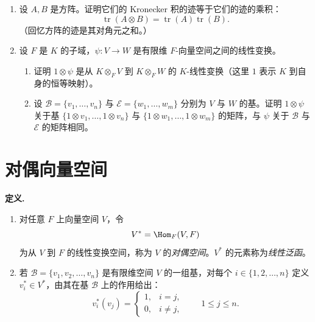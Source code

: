 \begin{enumerate}[label=\arabic*.,resume]
\begin{enumerate}[label=(\alph*)]
\item $F=\mathbb R$；
\item $F=\mathbb F_2$，二元素有限域（注意例如在该域上 $(x^2)'=2x=0$）；
\item $F=\mathbb F_3$；
\item $F=\mathbb F_5$。
\end{enumerate}
\item 设 $A,B$ 是方阵。证明它们的 Kronecker 积的迹等于它们的迹的乘积：
\[
\operatorname{tr}(A\otimes B)=\operatorname{tr}(A)\operatorname{tr}(B).
\]
（回忆方阵的迹是其对角元之和。）
\item 设 $F$ 是 $K$ 的子域，$\psi:V\to W$ 是有限维 $F$-向量空间之间的线性变换。
\begin{enumerate}[label=(\alph*)]
\item 证明 $1\otimes\psi$ 是从 $K\otimes_F V$ 到 $K\otimes_F W$ 的 $K$-线性变换（这里 $1$ 表示 $K$ 到自身的恒等映射）。
\item 设 $\mathcal B=\{v_1,\ldots,v_n\}$ 与 $\mathcal E=\{w_1,\ldots,w_m\}$ 分别为 $V$ 与 $W$ 的基。证明 $1\otimes\psi$ 关于基 $\{1\otimes v_1,\ldots,1\otimes v_n\}$ 与 $\{1\otimes w_1,\ldots,1\otimes w_m\}$ 的矩阵，与 $\psi$ 关于 $\mathcal B$ 与 $\mathcal E$ 的矩阵相同。
\end{enumerate}
\end{enumerate}

\section{对偶向量空间}

\noindent\textbf{定义.}
\begin{enumerate}[label=(\arabic*)]
\item 对任意 $F$ 上向量空间 $V$，令
\[
V^*=\Hom_F(V,F)
\]
为从 $V$ 到 $F$ 的线性变换空间，称为 $V$ 的\emph{对偶空间}。$V^*$ 的元素称为\emph{线性泛函}。
\item 若 $\mathcal B=\{v_1,v_2,\ldots,v_n\}$ 是有限维空间 $V$ 的一组基，对每个 $i\in\{1,2,\ldots,n\}$ 定义 $v_i^*\in V^*$，由其在基 $\mathcal B$ 上的作用给出：
\begin{equation}
v_i^*(v_j)=
\begin{cases}
1,& i=j,\\
0,& i\neq j,
\end{cases}
\qquad 1\leq j\leq n.
\tag{11.6}
\end{equation}
\end{enumerate}


